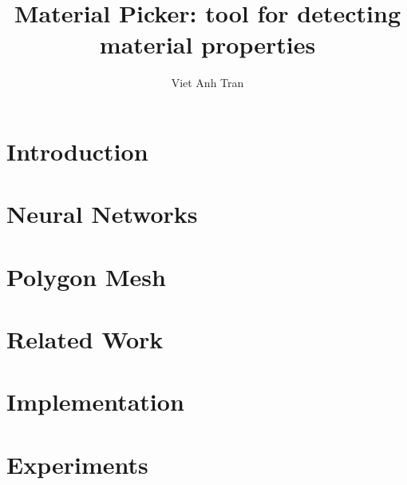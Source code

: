 \documentclass[thesis=M,english]{FITthesis}[2023/2/2]
\title{Material Picker: tool for detecting material properties}
\author{Viet Anh Tran} %
\begin{document}
	\chapter{Introduction}\label{ch:introduction}
	\newpage\cleardoublepage
	\chapter{Neural Networks}\label{ch:neural_network}
	\newpage\cleardoublepage
	\chapter{Polygon Mesh}\label{ch:polygon_mesh}
	\newpage\cleardoublepage
	\chapter{Related Work}\label{ch:related_works}
	\newpage\cleardoublepage
	\chapter{Implementation}\label{ch:implementation}
	\newpage\cleardoublepage
	\chapter{Experiments}\label{ch:experiments}
	\newpage\cleardoublepage
\end{document}
